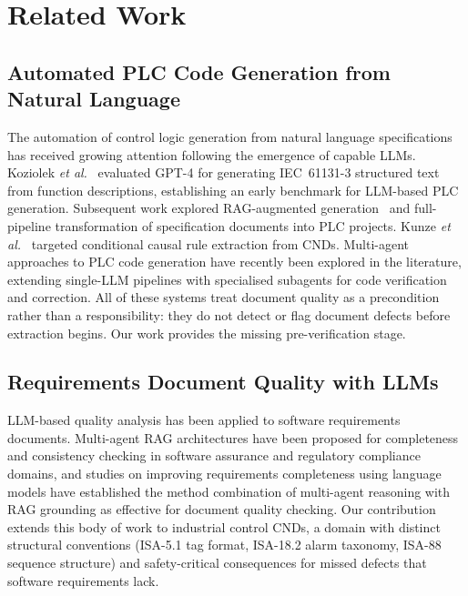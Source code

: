 \documentclass[journal]{IEEEtran}
\begin{document}
\section{Related Work}
\label{sec:related}

\subsection{Automated PLC Code Generation from Natural Language}

The automation of control logic generation from natural language specifications
has received growing attention following the emergence of capable LLMs.
Koziolek \textit{et al.}~\cite{koziolek2023} evaluated GPT-4 for generating
IEC~61131-3 structured text from function descriptions, establishing an early
benchmark for LLM-based PLC generation. Subsequent work explored
RAG-augmented generation~\cite{koziolek2024rag} and full-pipeline transformation
of specification documents into PLC projects. Kunze \textit{et
al.}~\cite{kunze2025} targeted conditional causal rule extraction from CNDs.
Multi-agent approaches to PLC code generation have recently been explored in
the literature, extending single-LLM pipelines with specialised subagents for
code verification and correction. All of these systems treat document quality
as a precondition rather than a responsibility: they do not detect or flag
document defects before extraction begins. Our work provides the missing
pre-verification stage.

\subsection{Requirements Document Quality with LLMs}

LLM-based quality analysis has been applied to software requirements documents.
Multi-agent RAG architectures have been proposed for completeness and
consistency checking in software assurance and regulatory compliance domains,
and studies on improving requirements completeness using language models have
established the method combination of multi-agent reasoning with RAG grounding
as effective for document quality checking. Our contribution extends this body
of work to industrial control CNDs, a domain with distinct structural conventions
(ISA-5.1 tag format, ISA-18.2 alarm taxonomy, ISA-88 sequence structure) and
safety-critical consequences for missed defects that software requirements lack.
\end{document}
